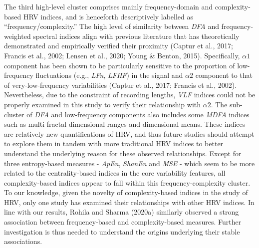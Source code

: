 \documentclass[
  english,
  jou,floatsintext]{apa6}
\begin{document}
The third high-level cluster comprises mainly frequency-domain and complexity-based HRV indices, and is henceforth descriptively labelled as ``frequency/complexity.'' The high level of similarity between \emph{DFA} and frequency-weighted spectral indices align with previous literature that has theoretically demonstrated and empirically verified their proximity (Captur et al., 2017; Francis et al., 2002; Lensen et al., 2020; Young \& Benton, 2015). Specifically, \(\alpha1\) component has been shown to be particularly sensitive to the proportion of low-frequency fluctuations (e.g., \emph{LFn}, \emph{LFHF}) in the signal and \(\alpha2\) component to that of very-low-frequency variabilities (Captur et al., 2017; Francis et al., 2002). Nevertheless, due to the constraint of recording lengths, \emph{VLF} indices could not be properly examined in this study to verify their relationship with \(\alpha2\). The sub-cluster of \emph{DFA} and low-frequency components also includes some \emph{MDFA} indices such as multi-fractal dimensional ranges and dimensional means. These indices are relatively new quantifications of HRV, and thus future studies should attempt to explore them in tandem with more traditional HRV indices to better understand the underlying reason for these observed relationships. Except for three entropy-based measures - \emph{ApEn}, \emph{ShanEn} and \emph{MSE} - which seem to be more related to the centrality-based indices in the core variability features, all complexity-based indices appear to fall within this frequency-complexity cluster. To our knowledge, given the novelty of complexity-based indices in the study of HRV, only one study has examined their relationships with other HRV indices. In line with our results, Rohila and Sharma (2020a) similarly observed a strong association between frequency-based and complexity-based measures. Further investigation is thus needed to understand the origins underlying their stable associations.
\end{document}
